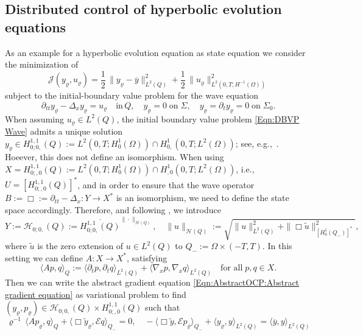 \documentclass{article}
\numberwithin{equation}{section}
\begin{document}
\subsection{Distributed control of hyperbolic evolution equations}
%
As an example for a hyperbolic evolution equation as state equation we
consider the minimization of
\[
  {\mathcal{J}}(y_\varrho,u_\varrho) =
  \frac{1}{2} \, \| y_\varrho - \overline{y} \|_{L^2(Q)}^2 +
  \frac{1}{2} \, \| u_\varrho \|^2_{L^2(0,T;H^{-1}(\Omega))}
\]
subject to the 
initial-boundary value problem  for the wave equation
%
\begin{equation}\label{Eqn:DBVP Wave}
  \partial_{tt} y_\varrho - \Delta_x y_\varrho = u_\varrho \quad
  \mbox{in} \, Q, \quad y_\varrho = 0 \; \mbox{on} \; \Sigma, \quad
  y_\varrho = \partial_t y_\varrho = 0\; \mbox{on} \; \Sigma_0.
\end{equation}
%
When assuming $u_\varrho \in L^2(Q)$, the initial boundary value problem
\eqref{Eqn:DBVP Wave} admits a unique solution
$y_\varrho \in H^{1,1}_{0;0,}(Q) := L^2(0,T;H^1_0(\Omega)) \cap
H^1_{0,}(0,T;L^2(\Omega))$; see, e.g.,~\cite{Ladyzhenskaya:1985,SteinbachZank:2020}.
Hoeever, this does not define an isomorphism. 
When using
$X = H^{1,1}_{0;,0}(Q) := L^2(0,T;H^1_0(\Omega)) \cap
H^1_{,0}(0,T;L^2(\Omega))$, i.e., $U = [H^{1,1}_{0;,0}(Q)]^*$, and in
order to ensure that the wave operator
$ B := \Box := \partial_{tt} - \Delta_x : Y \to X^*$ is
an isomorphism, we need to define the state space accordingly.
Therefore, and following \cite{SteinbachZank:2022}, we introduce
\[
  Y := {\mathcal{H}}_{0;0,}(Q) :=
  \overline{H^{1,1}_{0;0,}(Q)}^{\| \cdot \|_{{\mathcal{H}}(Q)}}, \quad
  \| u \|_{{\mathcal{H}}(Q)} := \sqrt{\| u \|^2_{L^2(Q)} +
  \| \Box \widetilde{u} \|^2_{[H^1_0(Q_-)]^*}},
\]
where $\widetilde{u}$ is the zero extension of $u \in L^2(Q)$ to
$Q_- := \Omega \times (-T,T)$. In this setting we can define
$A : X \to X^*$, satisfying
\[
  \langle A p,q \rangle_Q :=
  \langle \partial_t p , \partial_t q \rangle_{L^2(Q)} +
  \langle \nabla_x p , \nabla_x q \rangle_{L^2(Q)} \quad
  \mbox{for all} \; p,q \in X .
\]
Then we can write the abstract gradient equation
\eqref{Eqn:AbstractOCP:Abstract gradient equation}
as variational problem to find
$(y_\varrho,p_\varrho) \in {\mathcal{H}}_{0;0,}(Q) \times
H^{1,1}_{0;,0}(Q)$ such that
\begin{equation}\label{Eqn:OCP Wave}
  \varrho^{-1} \, \langle A p_\varrho , q \rangle_Q +
  \langle \Box \widetilde{y}_\varrho , {\mathcal{E}} q \rangle_{Q_-} = 0,
  \quad
  - \langle \Box \widetilde{y} , {\mathcal{E}} p_\varrho \rangle_{Q_-} +
  \langle y_\varrho , y \rangle_{L^2(Q)} =
  \langle \overline{y} , y \rangle_{L^2(Q)}
\end{equation}
\end{document}
